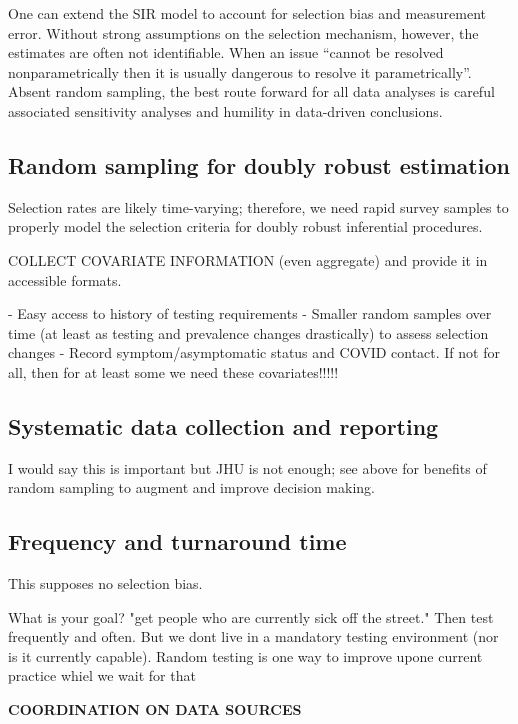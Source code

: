 \documentclass[12pt]{amsart}
\numberwithin{equation}{section}
\theoremstyle{plain}
\begin{document}
One can extend the SIR model to account for selection bias and measurement error. Without strong assumptions on the selection mechanism, however, the estimates are often not identifiable.  When an issue ``cannot be resolved nonparametrically then it is usually dangerous to resolve it parametrically''\citep{CoxHink74}. Absent random sampling, the best route forward for all data analyses is careful associated sensitivity analyses and humility in data-driven conclusions.

\subsection*{Random sampling for doubly robust estimation}

Selection rates are likely time-varying; therefore, we need rapid survey samples to properly model the selection criteria for doubly robust inferential procedures.

COLLECT COVARIATE INFORMATION (even aggregate) and provide it in accessible formats.

- Easy access to history of testing requirements
- Smaller random samples over time (at least as testing and prevalence changes drastically) to assess selection changes
- Record symptom/asymptomatic status and COVID contact.  If not for all, then for at least some we need these covariates!!!!!

\subsection*{Systematic data collection and reporting}

I would say this is important but JHU is not enough; see above for benefits of random sampling to augment and improve decision making.

\subsection*{Frequency and turnaround time}

This supposes no selection bias.




What is your goal?  "get people who are currently sick off the street." Then test frequently and often.  But we dont live in a mandatory testing environment (nor is it currently capable).  Random testing is one way to improve upone current practice whiel we wait for that

{\bf COORDINATION ON DATA SOURCES}
\end{document}
